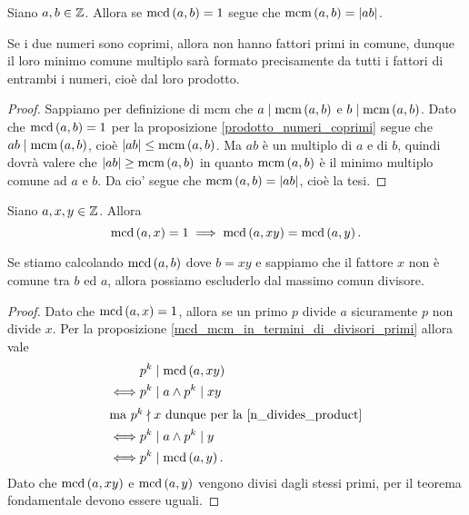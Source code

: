 \begin{proposition}\label{mcm_equals_product}
    Siano $a, b \in \mathbb{Z}$. Allora se $\operatorname{mcd}\left(a, b\right) = 1$ segue che $\operatorname{mcm}\left(a, b\right) = \left|ab\right|$.
\end{proposition}
\begin{intuition}
    Se i due numeri sono coprimi, allora non hanno fattori primi in comune, dunque il loro minimo comune multiplo sarà formato precisamente da tutti i fattori di entrambi i numeri, cioè dal loro prodotto.
\end{intuition}
\begin{proof}
    Sappiamo per definizione di mcm che $a \mid \operatorname{mcm}\left(a, b\right)$ e $b \mid \operatorname{mcm}\left(a, b\right)$. Dato che $\operatorname{mcd}\left(a, b\right) = 1$ per la proposizione \ref{prodotto_numeri_coprimi} segue che $ab \mid \operatorname{mcm}\left(a, b\right)$, cioè $\left|ab\right| \leq \operatorname{mcm}\left(a, b\right)$. Ma $ab$ è un multiplo di $a$ e di $b$, quindi dovrà valere che $\left|ab\right| \geq \operatorname{mcm}\left(a, b\right)$ in quanto $\operatorname{mcm}\left(a, b\right)$ è il minimo multiplo comune ad $a$ e $b$. Da cio' segue che $\operatorname{mcm}\left(a, b\right) = \left|ab\right|$, cioè la tesi.
\end{proof}

\begin{proposition} \label{mcd_togliere_fattori_non_comuni}
    Siano $a, x, y \in \mathbb{Z}$. Allora 
    \begin{equation}
        \operatorname{mcd}\left(a, x\right) = 1 \implies \operatorname{mcd}\left(a, xy\right) = \operatorname{mcd}\left(a, y\right).
    \end{equation}
\end{proposition}
\begin{intuition}
    Se stiamo calcolando $\operatorname{mcd}\left(a, b\right)$ dove $b = xy$ e sappiamo che il fattore $x$ non è comune tra $b$ ed $a$, allora possiamo escluderlo dal massimo comun divisore.
\end{intuition}
\begin{proof}
    Dato che $\operatorname{mcd}\left(a, x\right) = 1$, allora se un primo $p$ divide $a$ sicuramente $p$ non divide $x$. Per la proposizione \ref{mcd_mcm_in_termini_di_divisori_primi} allora vale
    \begin{alignat*}
        {1}
        &p^k \mid \operatorname{mcd}\left(a, xy\right) \\ 
        \iff &p^k \mid a \land p^k \mid xy\\
        \intertext{ma $p^k \nmid x$ dunque per la \ref{n_divides_product}}
        \iff &p^k \mid a \land p^k \mid y \\
        \iff &p^k \mid \operatorname{mcd}\left(a, y\right).
    \end{alignat*}
    Dato che $\operatorname{mcd}\left(a, xy\right)$ e $\operatorname{mcd}\left(a, y\right)$ vengono divisi dagli stessi primi, per il teorema fondamentale devono essere uguali.
\end{proof}

